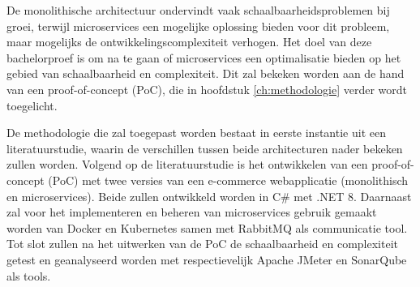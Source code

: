 De monolithische architectuur ondervindt vaak schaalbaarheidsproblemen bij groei, terwijl microservices een mogelijke oplossing bieden voor dit probleem, maar mogelijks de ontwikkelingscomplexiteit verhogen. Het doel van deze bachelorproef is om na te gaan of microservices een optimalisatie bieden op het gebied van schaalbaarheid en complexiteit. Dit zal bekeken worden aan de hand van een proof-of-concept (PoC), die in hoofdstuk \ref{ch:methodologie} verder wordt toegelicht.\newline

De methodologie die zal toegepast worden bestaat in eerste instantie uit een literatuurstudie, waarin de verschillen tussen beide architecturen nader bekeken zullen worden. Volgend op de literatuurstudie is het ontwikkelen van een proof-of-concept (PoC) met twee versies van een e-commerce webapplicatie (monolithisch en microservices). Beide zullen ontwikkeld worden in C\# met .NET 8. Daarnaast zal voor het implementeren en beheren van microservices gebruik gemaakt worden van Docker en Kubernetes samen met RabbitMQ als communicatie tool. Tot slot zullen na het uitwerken van de PoC de schaalbaarheid en complexiteit getest en geanalyseerd worden met respectievelijk Apache JMeter en SonarQube als tools.\newline
